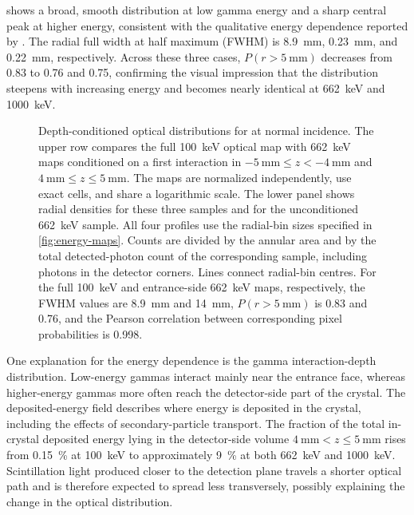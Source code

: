  shows a broad, smooth distribution at low gamma energy and a sharp central peak at higher energy, consistent with the qualitative energy dependence reported by \textcite{ovsiannikova2020light}. The radial full width at half maximum (FWHM) is \qty{8.9}{\milli\metre}, \qty{0.23}{\milli\metre}, and \qty{0.22}{\milli\metre}, respectively. Across these three cases, $P(r>\qty{5}{\milli\metre})$ decreases from 0.83 to 0.76 and 0.75, confirming the visual impression that the distribution steepens with increasing energy and becomes nearly identical at \qty{662}{\kilo\electronvolt} and \qty{1000}{\kilo\electronvolt}.



\begin{figure}[H]
  \centering
  \caption{Depth-conditioned optical distributions for  at normal incidence. The upper row compares the full \qty{100}{\kilo\electronvolt} optical map with \qty{662}{\kilo\electronvolt} maps conditioned on a first interaction in $\qty{-5}{\milli\metre}\leq z<\qty{-4}{\milli\metre}$ and $\qty{4}{\milli\metre}\leq z\leq\qty{5}{\milli\metre}$. The maps are normalized independently, use exact  cells, and share a logarithmic scale. The lower panel shows radial densities for these three samples and for the unconditioned \qty{662}{\kilo\electronvolt} sample. All four profiles use the radial-bin sizes specified in \cref{fig:energy-maps}. Counts are divided by the annular area and by the total detected-photon count of the corresponding sample, including photons in the detector corners. Lines connect radial-bin centres. For the full \qty{100}{\kilo\electronvolt} and entrance-side \qty{662}{\kilo\electronvolt} maps, respectively, the FWHM values are \qty{8.9}{\milli\metre} and \qty{14}{\milli\metre}, $P(r>\qty{5}{\milli\metre})$ is 0.83 and 0.76, and the Pearson correlation between corresponding pixel probabilities is 0.998.}
  \label{fig:depth-conditioning}
\end{figure}

One explanation for the energy dependence is the gamma interaction-depth distribution. Low-energy gammas interact mainly near the entrance face, whereas higher-energy gammas more often reach the detector-side part of the crystal. The deposited-energy field describes where energy is deposited in the crystal, including the effects of secondary-particle transport. The fraction of the total in-crystal deposited energy lying in the detector-side volume $\qty{4}{\milli\metre}<z\leq\qty{5}{\milli\metre}$ rises from \qty{0.15}{\percent} at \qty{100}{\kilo\electronvolt} to approximately \qty{9}{\percent} at both \qty{662}{\kilo\electronvolt} and \qty{1000}{\kilo\electronvolt}. Scintillation light produced closer to the detection plane travels a shorter optical path and is therefore expected to spread less transversely, possibly explaining the change in the optical distribution.

